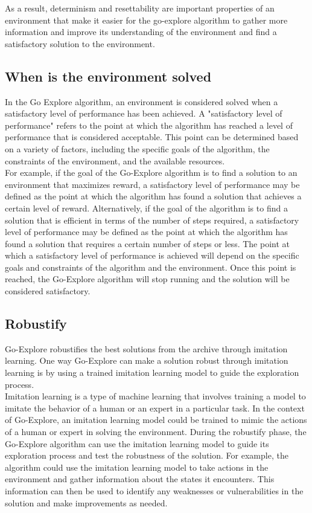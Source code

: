 \documentclass[runningheads]{llncs}%
\begin{document}
As a result, determinism and resettability are important properties of an environment that make it easier for the go-explore algorithm to gather more information and improve its understanding of the environment and find a satisfactory solution to the environment.


\subsection{When is the environment solved}
In the Go Explore algorithm, an environment is considered solved when a satisfactory level of performance has been achieved. A "satisfactory level of performance" refers to the point at which the algorithm has reached a level of performance that is considered acceptable. This point can be determined based on a variety of factors, including the specific goals of the algorithm, the constraints of the environment, and the available resources.\\

For example, if the goal of the Go-Explore algorithm is to find a solution to an environment that maximizes reward, a satisfactory level of performance may be defined as the point at which the algorithm has found a solution that achieves a certain level of reward. Alternatively, if the goal of the algorithm is to find a solution that is efficient in terms of the number of steps required, a satisfactory level of performance may be defined as the point at which the algorithm has found a solution that requires a certain number of steps or less. The point at which a satisfactory level of performance is achieved will depend on the specific goals and constraints of the algorithm and the environment. Once this point is reached, the Go-Explore algorithm will stop running and the solution will be considered satisfactory.

\subsection{Robustify}
Go-Explore robustifies the best solutions from the archive through imitation learning. One way Go-Explore can make a solution robust through imitation learning is by using a trained imitation learning model to guide the exploration process.\\

Imitation learning is a type of machine learning that involves training a model to imitate the behavior of a human or an expert in a particular task. In the context of Go-Explore, an imitation learning model could be trained to mimic the actions of a human or expert in solving the environment. During the robustify phase, the Go-Explore algorithm can use the imitation learning model to guide its exploration process and test the robustness of the solution. For example, the algorithm could use the imitation learning model to take actions in the environment and gather information about the states it encounters. This information can then be used to identify any weaknesses or vulnerabilities in the solution and make improvements as needed.\\
\end{document}
